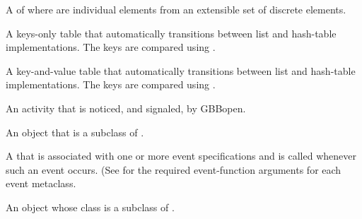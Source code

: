 \begin{glossary-list}

%
%
%
%
A  of   where
  are individual elements from an
extensible set of discrete elements.

  
\glent[ESET]
%
%
A keys-only table that automatically transitions between list and hash-table
implementations.  The keys are compared using .

  
\glent[ET]
%
A key-and-value table that automatically transitions between list and hash-table
implementations.  The keys are compared using .


\glent[event]
%
%
%
An activity that is noticed, and signaled, by GBBopen.


%
%
%
%
%
%
An object that is a subclass of .


%
%
%
%
%
A  that is associated with one or more event specifications
and is called whenever such an event occurs.  (See
 for the required event-function arguments for
each event metaclass.


%
%
%
%
%
%
An object whose class is a subclass of
.


\end{glossary-list}
